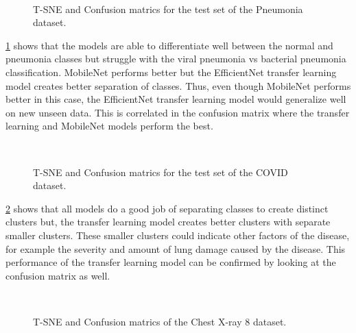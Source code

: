 \documentclass[10pt,twocolumn,letterpaper]{article}
\begin{document}
\begin{figure}
  \\
  \caption{T-SNE and Confusion matrics for the test set of the Pneumonia dataset.}
  \label{fig:tsne_pneumonia}
\end{figure}


\cref{fig:tsne_pneumonia} shows that the models are able to differentiate well between the normal and pneumonia 
classes but struggle with the viral pneumonia vs bacterial pneumonia classification. MobileNet performs better 
but the EfficientNet transfer learning model creates better separation of classes. Thus, even though 
MobileNet performs better in this case, 
the EfficientNet transfer learning model would generalize well on new unseen data. This is correlated in 
the confusion matrix where the transfer learning and MobileNet models perform the best.

\begin{figure}
  \\
  \caption{T-SNE and Confusion matrics for the test set of the COVID dataset.}
  \label{fig:tsne_covid}
\end{figure}

\cref{fig:tsne_covid} shows that all models do a good job of separating classes to create distinct clusters 
but, the transfer learning model creates better clusters with separate smaller clusters. These smaller 
clusters could indicate other factors of the disease, for example the severity and amount of lung damage caused 
by the disease. This performance of the transfer learning model can be confirmed by looking at the confusion 
matrix as well.

\begin{figure}
  \\
  \caption{T-SNE and Confusion matrics of the Chest X-ray 8 dataset.}
  \label{fig:tsne_xray8}
\end{figure}
\end{document}
